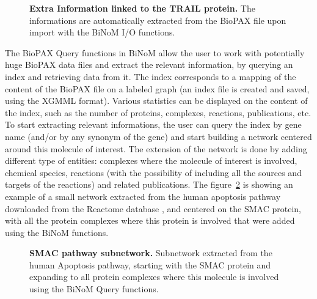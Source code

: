 \documentclass[10pt]{bmc_article}
\newenvironment{bmcformat}{\baselineskip20pt\sloppy\setboolean{publ}{false}}{\baselineskip20pt\sloppy}
\begin{document}
\begin{bmcformat}
\begin{figure}[h]
 \caption{\label{biopaxtrailprop}  \textbf{Extra Information linked to the TRAIL protein.}
      The informations are automatically extracted from the BioPAX file upon
import with the BiNoM I/O functions.}
\end{figure}


The BioPAX Query functions in BiNoM allow the user to work with potentially huge
BioPAX data files and extract the relevant information, by querying an index and
retrieving data from it. The index corresponds to a mapping of the content of
the BioPAX file on a labeled graph (an index file is created and saved, using
the XGMML format). Various statistics can be displayed on the content of the
index, such as the number of proteins, complexes, reactions, publications, etc.
To start extracting relevant informations, the user can query the index by gene
name (and/or by any synonym of the gene) and start building a network centered
around this molecule of interest. The extension of the network is done by adding
different type of entities: complexes where the molecule of interest is
involved, chemical species, reactions (with the possibility of including all the
sources and targets of the reactions) and related publications. The figure~\ref{smaccomplexes}
is showing an example of a small network extracted from the human apoptosis
pathway downloaded from the Reactome database \cite{joshi2005reactome}, and
centered on the SMAC protein, with all the protein complexes where
this protein is involved that were added using the BiNoM functions.


\begin{figure}[h]
 \caption{\label{smaccomplexes}  \textbf{SMAC pathway subnetwork.}
      Subnetwork extracted from the human Apoptosis pathway, starting with the
SMAC protein and expanding to all protein complexes where this
molecule is involved using the BiNoM Query functions.}
\end{figure}



\end{bmcformat}
\end{document}
